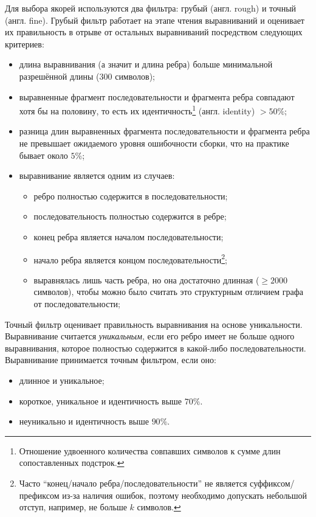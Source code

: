 \documentclass[14pt]{matmex-diploma-custom}
\begin{document}
Для выбора якорей используются два фильтра: грубый (англ. rough) и точный (англ. fine). Грубый фильтр работает на этапе чтения выравниваний и оценивает их правильность в отрыве от остальных выравниваний посредством следующих критериев:
\begin{itemize}
    \item длина выравнивания (а значит и длина ребра) больше минимальной разрешённой длины ($300$ символов);
    \item выравненные фрагмент последовательности и фрагмента ребра совпадают хотя бы на половину, то есть их идентичность\footnote{Отношение удвоенного количества совпавших символов к сумме длин сопоставленных подстрок.} (англ. identity) $> 50\%$;
    \item разница длин выравненных фрагмента последовательности и фрагмента ребра не превышает ожидаемого уровня ошибочности сборки, что на практике бывает около $5\%$;
    \item выравнивание является одним из случаев:
    \begin{itemize}
        \item ребро полностью содержится в последовательности;
        \item последовательность полностью содержится в ребре;
        \item конец ребра является началом последовательности;
        \item начало ребра является концом последовательности\footnote{Часто ``конец/начало ребра/последовательности'' не является суффиксом/префиксом из-за наличия ошибок, поэтому необходимо допускать небольшой отступ, например, не больше $k$ символов.};
        \item выравнялась лишь часть ребра, но она достаточно длинная ($\ge 2000$ символов), чтобы можно было считать это структурным отличием графа от последовательности;
    \end{itemize}
\end{itemize}

Точный фильтр оценивает правильность выравнивания на основе уникальности. Выравнивание считается \textit{уникальным}, если его ребро имеет не больше одного выравнивания, которое полностью содержится в какой-либо последовательности. Выравнивание принимается точным фильтром, если оно:
\begin{itemize}
    \item длинное и уникальное;
    \item короткое, уникальное и идентичность выше $70\%$.
    \item неуникально и идентичность выше $90\%$.
\end{itemize}
\end{document}
